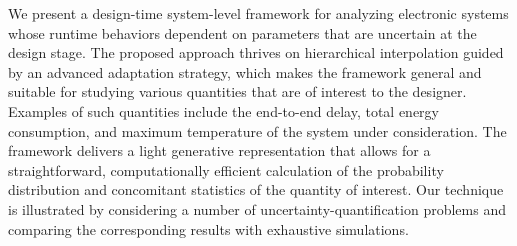 We present a design-time system-level framework for analyzing electronic systems
whose runtime behaviors dependent on parameters that are uncertain at the design
stage. The proposed approach thrives on hierarchical interpolation guided by an
advanced adaptation strategy, which makes the framework general and suitable for
studying various quantities that are of interest to the designer. Examples of
such quantities include the end-to-end delay, total energy consumption, and
maximum temperature of the system under consideration. The framework delivers a
light generative representation that allows for a straightforward,
computationally efficient calculation of the probability distribution and
concomitant statistics of the quantity of interest. Our technique is illustrated
by considering a number of uncertainty-quantification problems and comparing the
corresponding results with exhaustive simulations.

